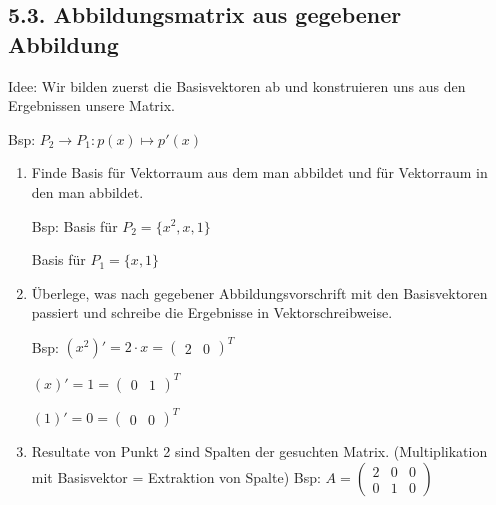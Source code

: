 \subsection{5.3. Abbildungsmatrix aus gegebener Abbildung}{
\vskip1pt
Idee: Wir bilden zuerst die Basisvektoren ab und konstruieren uns aus den Ergebnissen unsere Matrix. \par
\vspace{0pt}
\begin{center}Bsp: $P_2 \rightarrow P_1: p(x) \mapsto p'(x)$ \end{center}
\vspace{-5pt}
\begin{enumerate}[label=\protect\circled{\arabic*}]
\item Finde Basis für Vektorraum aus dem man abbildet und für Vektorraum in den man abbildet. \par
\vskip2pt Bsp: Basis für $P_2 = \{x^2, x, 1\}$ \par
\hskip16pt Basis für $P_1 = \{x, 1\}$
\item Überlege, was nach gegebener Abbildungsvorschrift mit den Basisvektoren passiert und schreibe die Ergebnisse in Vektorschreibweise. \par
\vskip2pt Bsp: $(x^2)' = 2\cdot x = \begin{pmatrix} 2 & 0 \end{pmatrix}^T$ \par
\hskip17pt $(x)' = 1 = \begin{pmatrix} 0 & 1 \end{pmatrix}^T$ \par
\hskip17pt $(1)' = 0 = \begin{pmatrix} 0 & 0 \end{pmatrix}^T$
\item Resultate von Punkt 2 sind Spalten der gesuchten Matrix. (Multiplikation mit Basisvektor = Extraktion von Spalte)
\vskip2pt Bsp: $A = \begin{pmatrix} 2 & 0 & 0 \\ 0 & 1 & 0 \end{pmatrix}$
\end{enumerate}
\vspace{-1mm}
}
\WhiteSpace
